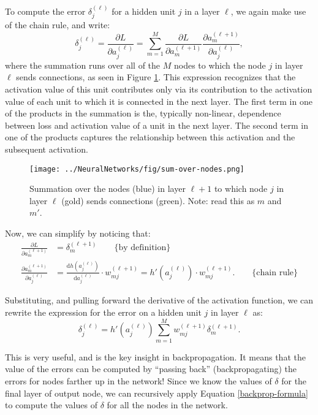 To compute the error $\delta^{(\ell)}_{j}$ for a hidden unit $j$ in a layer $\ell$, we again make use of the chain rule, and write:
%
\begin{equation} \label{backprop-for-deltas}
	\delta^{(\ell)}_{j} = \frac{\partial L}{\partial a^{(\ell)}_{j}} = \sum_{m=1}^{M} \frac{\partial L}{\partial a^{(\ell+1)}_{m}} \frac{\partial a^{(\ell+1)}_{m}}{\partial a_{j}^{(\ell)}}, 
\end{equation}
where the summation runs over all of the $M$ nodes to which the node $j$ in layer $\ell$ sends connections, as seen in Figure \ref{fig:sum-over-nodes}. This expression recognizes that the activation value of this unit contributes only via its contribution to the activation value of each unit to which it is connected in the next layer. The first term in
one of the  products in the summation is the, typically non-linear, dependence between loss and activation value of a unit in the next layer. The second term in one of the products captures the relationship between this activation and the subsequent activation.
%
%
\begin{figure}
    \centering
    \texttt{[image: ../NeuralNetworks/fig/sum-over-nodes.png]}
    \caption{Summation over the nodes (blue) in layer $\ell+1$ to which node $j$ in layer $\ell$ (gold) sends connections (green). Note: read this as $m$ and $m'$.}
    \label{fig:sum-over-nodes}
\end{figure}

Now, we can simplify by noticing that:
%
\begin{align}
  \frac{\partial L}{\partial a_m^{(\ell+1)}}&=\delta^{(\ell+1)}_m \quad\quad\mbox{\{by definition\}}\\
  \frac{\partial a_m^{(\ell+1)}}{\partial a_j^{(\ell)}}&=\frac{\mathrm{d}h(a_j^{(\ell)})}{\mathrm{d}a_j^{(\ell)}}\cdot w^{(\ell+1)}_{mj}=h'(a_j^{(\ell)})\cdot w_{mj}^{(\ell+1)}. \quad\quad\mbox{\{chain rule\}}
\end{align}

Substituting, and pulling forward the derivative of the activation function, we can rewrite the expression for the error on a hidden unit $j$ in layer $\ell$ as:
%
\begin{equation} \label{backprop-formula}
	\delta^{(\ell)}_{j} = h'(a^{(\ell)}_{j}) \sum_{m=1}^{M} w^{(\ell+1)}_{mj} \delta^{(\ell+1)}_{m}.
      \end{equation}

      This is very useful, and is the key insight in backpropagation.  It means that the value of the errors  can be computed by ``passing back'' (backpropagating) the errors for  nodes farther up in the network!
%
Since we know the values of $\delta$ for the final layer of output node, we can recursively apply Equation \ref{backprop-formula} to compute the values of $\delta$ for all the nodes in the network.

